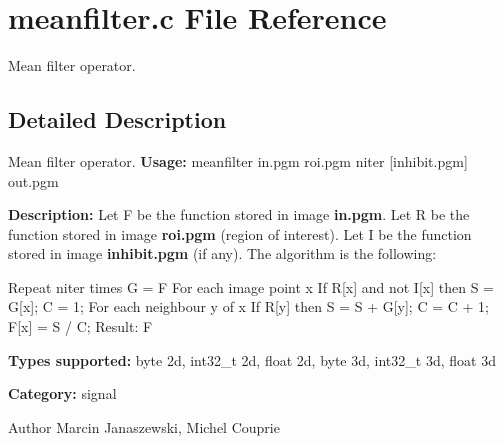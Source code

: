 \section{meanfilter.c File Reference}
\label{meanfilter_8c}


Mean filter operator.  




\subsection{Detailed Description}
Mean filter operator. {\bfseries Usage:} meanfilter in.pgm roi.pgm niter [inhibit.pgm] out.pgm

{\bfseries Description:} Let F be the function stored in image {\bfseries in.pgm}. Let R be the function stored in image {\bfseries roi.pgm} (region of interest). Let I be the function stored in image {\bfseries inhibit.pgm} (if any). The algorithm is the following:

\begin{DoxyVerb}
Repeat niter times
  G = F
  For each image point x
    If R[x] and not I[x] then
      S = G[x]; C = 1;
      For each neighbour y of x
        If R[y] then S = S + G[y]; C = C + 1;
      F[x] = S / C;
Result: F
\end{DoxyVerb}


{\bfseries Types supported:} byte 2d, int32\_\-t 2d, float 2d, byte 3d, int32\_\-t 3d, float 3d

{\bfseries Category:} signal

\begin{DoxyAuthor}{Author}
Marcin Janaszewski, Michel Couprie 
\end{DoxyAuthor}
